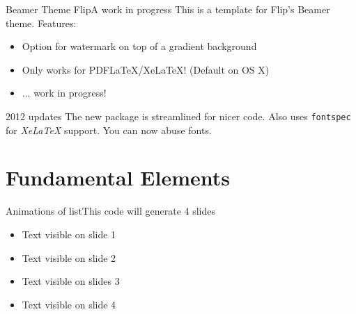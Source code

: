 \begin{frame}[c]{Beamer Theme Flip}{A work in progress}
	This is a template for Flip's Beamer theme. Features:
	\begin{itemize}
		\normalsize
		\item Option for watermark on top of a gradient background
		\item Only works for PDFLaTeX/XeLaTeX! (Default on OS X)
		\item ... work in progress!
	\end{itemize}

	\begin{block}{2012 updates}
		The new package is streamlined for nicer code. Also uses \texttt{fontspec} for \textit{XeLaTeX} support. You can now abuse fonts.
	\end{block}

\end{frame}

\section{Fundamental Elements}

\begin{frame}[c]{Animations of list}{This code will generate 4 slides}

	\begin{itemize}
		\item<1-> Text visible on slide 1
		\item<2-> Text visible on slide 2
		\item<3> Text visible on slides 3
		\item<4-> Text visible on slide 4
	\end{itemize}
\end{frame}

